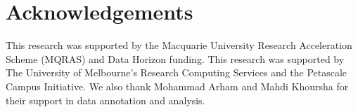 \section*{Acknowledgements}
This research was supported by the Macquarie University Research Acceleration Scheme (MQRAS) and Data Horizon funding.
This research was supported by The University of Melbourne’s Research Computing Services and the Petascale Campus Initiative.
We also thank Mohammad Arham and Mahdi Khoursha for their support in data annotation and analysis.
